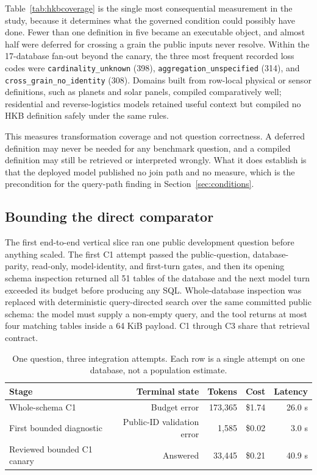 Table~\ref{tab:hkbcoverage} is the single most consequential measurement in the study,
because it determines what the governed condition could possibly have done. Fewer
than one definition in five became an executable object, and almost half were
deferred for crossing a grain the public inputs never resolve. Within the
17-database fan-out beyond the canary, the three most frequent recorded loss
codes were \texttt{cardinality\_unknown} (398), \texttt{aggregation\_unspecified}
(314), and \texttt{cross\_grain\_no\_identity} (308). Domains built from
row-local physical or sensor definitions, such as planets and solar panels,
compiled comparatively well; residential and reverse-logistics models retained
useful context but compiled no HKB definition safely under the same rules.

This measures transformation coverage and not question correctness. A deferred
definition may never be needed for any benchmark question, and a compiled
definition may still be retrieved or interpreted wrongly. What it does establish
is that the deployed model published no join path and no measure, which is the
precondition for the query-path finding in Section~\ref{sec:conditions}.

\subsection{Bounding the direct comparator}

The first end-to-end vertical slice ran one public development question before
anything scaled. The first C1 attempt passed the public-question,
database-parity, read-only, model-identity, and first-turn gates, and then its
opening schema inspection returned all 51 tables of the database and the next
model turn exceeded its budget before producing any SQL. Whole-database
inspection was replaced with deterministic query-directed search over the same
committed public schema: the model must supply a non-empty query, and the tool
returns at most four matching tables inside a 64 KiB payload. C1 through C3 share
that retrieval contract.

\begin{table}[htbp]
\centering
\caption{One question, three integration attempts. Each row is a single attempt
on one database, not a population estimate.}
\label{tab:slice}
\begin{tabular}{lrrrr}
\toprule
Stage & Terminal state & Tokens & Cost & Latency \\
\midrule
Whole-schema C1 & Budget error & 173,365 & \$1.74 & 26.0 s \\
First bounded diagnostic & Public-ID validation error & 1,585 & \$0.02 & 3.0 s \\
Reviewed bounded C1 canary & Answered & 33,445 & \$0.21 & 40.9 s \\
\bottomrule
\end{tabular}
\end{table}

